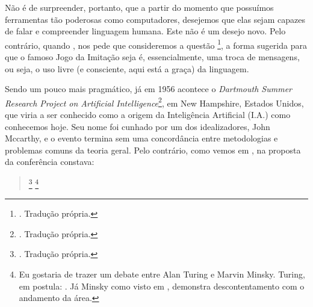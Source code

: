 Não é de surpreender, portanto, que a partir do momento que possuímos ferramentas tão poderosas como computadores, desejemos que elas sejam capazes de falar e compreender linguagem humana. Este não é um desejo novo. Pelo contrário, quando , nos pede que consideremos a questão \footnote{. Tradução própria.}, a forma sugerida para que o famoso Jogo da Imitação seja  é, essencialmente, uma troca de mensagens, ou seja, o uso livre (e consciente, aqui está a graça) da linguagem. 

Sendo um pouco mais pragmático, já em 1956 acontece o \textit{Dartmouth Summer Research Project on Artificial Intelligence}\footnote{. Tradução própria.}, em New Hampshire, Estados Unidos, que viria a ser conhecido como a origem da Inteligência Artificial (I.A.) como conhecemos hoje. Seu nome foi cunhado por um dos idealizadores, John Mccarthy, e o evento termina sem uma concordância entre metodologias e problemas comuns da teoria geral. Pelo contrário, como vemos em , na proposta da conferência constava:
\begin{quote}
    \footnote{. Tradução própria.}
    \footnote{Eu gostaria de trazer um debate entre Alan Turing e Marvin Minsky. Turing, em  postula: . Já Minsky como visto em , demonstra descontentamento com o andamento da área. }
\end{quote}

